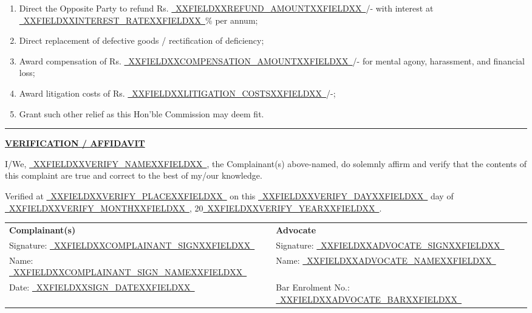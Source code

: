 \documentclass[12pt,a4paper]{article}
\newcommand{\fillline}[1]{\underline{~#1~}}
\begin{document}
\begin{enumerate}[label=(\alph*), itemsep=0.3em]
    \item Direct the Opposite Party to refund Rs. \fillline{XXFIELDXXREFUND_AMOUNTXXFIELDXX}/-
          with interest at \fillline{XXFIELDXXINTEREST_RATEXXFIELDXX}\% per annum;
    \item Direct replacement of defective goods / rectification of deficiency;
    \item Award compensation of Rs. \fillline{XXFIELDXXCOMPENSATION_AMOUNTXXFIELDXX}/- for mental
          agony, harassment, and financial loss;
    \item Award litigation costs of Rs. \fillline{XXFIELDXXLITIGATION_COSTSXXFIELDXX}/-;
    \item Grant such other relief as this Hon'ble Commission may deem fit.
\end{enumerate}

\vspace{1em}
\rule{\linewidth}{0.4pt}

\begin{center}
    \textbf{\uline{VERIFICATION / AFFIDAVIT}}
\end{center}

\noindent I/We, \fillline{XXFIELDXXVERIFY_NAMEXXFIELDXX}, the Complainant(s) above-named, do
solemnly affirm and verify that the contents of this complaint are true and
correct to the best of my/our knowledge.

\vspace{0.5em}

\noindent Verified at \fillline{XXFIELDXXVERIFY_PLACEXXFIELDXX} on this \fillline{XXFIELDXXVERIFY_DAYXXFIELDXX}
day of \fillline{XXFIELDXXVERIFY_MONTHXXFIELDXX}, 20\fillline{XXFIELDXXVERIFY_YEARXXFIELDXX}.

\vspace{2em}

\noindent
\begin{tabularx}{\textwidth}{@{}X X@{}}
    \textbf{Complainant(s)} & \textbf{Advocate}\\[1.5em]
    Signature: \fillline{XXFIELDXXCOMPLAINANT_SIGNXXFIELDXX} & Signature: \fillline{XXFIELDXXADVOCATE_SIGNXXFIELDXX}\\[0.5em]
    Name: \fillline{XXFIELDXXCOMPLAINANT_SIGN_NAMEXXFIELDXX} & Name: \fillline{XXFIELDXXADVOCATE_NAMEXXFIELDXX}\\[0.5em]
    Date: \fillline{XXFIELDXXSIGN_DATEXXFIELDXX} & Bar Enrolment No.: \fillline{XXFIELDXXADVOCATE_BARXXFIELDXX}\\
\end{tabularx}
\end{document}
